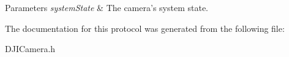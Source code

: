 \begin{DoxyParams}{Parameters}
{\em system\+State} & The camera's system state. \\
\hline
\end{DoxyParams}


The documentation for this protocol was generated from the following file\+:\begin{DoxyCompactItemize}
\item 
D\+J\+I\+Camera.\+h\end{DoxyCompactItemize}
